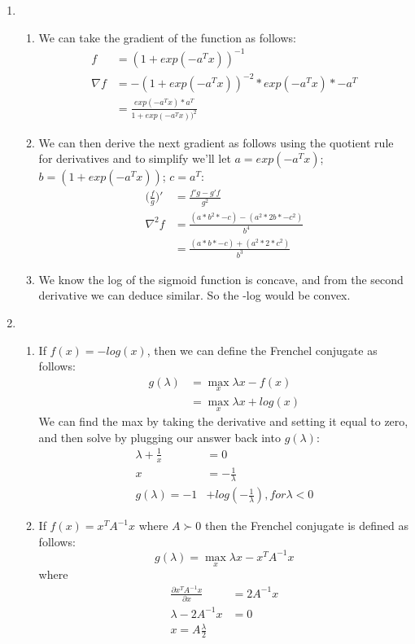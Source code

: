 \documentclass[11pt,a4paper]{article}
\begin{document}
\begin{enumerate}
			\item
			\begin{enumerate}
				\item We can take the gradient of the function as follows:
				\begin{align*}
				f &= (1+exp(-a^Tx))^{-1} \\
				\nabla f &= -(1+exp(-a^Tx))^{-2} * exp(-a^Tx) * -a^T \\
						 &= \frac{exp(-a^Tx) * a^T}{1+exp(-a^Tx))^{2}}
				\end{align*}
				\item We can then derive the next gradient as follows using the quotient rule for derivatives and to simplify we'll let $a = exp(-a^Tx)$; $b=(1+exp(-a^Tx))$; $c = a^T$:
				\begin{align*}
				\Big(\frac{f}{g}\Big)' &= \frac{f'g - g'f}{g^2} \\
				\nabla^2 f &= \frac{(a * b^2 * -c) - (a^2 * 2b * -c^2)}{b^4} \\
				&= \frac{(a * b * -c) + (a^2 * 2 * c^2)}{b^3}
				\end{align*}
				\item We know the log of the sigmoid function is concave, and from the second derivative we can deduce similar. So the -log would be convex.
			\end{enumerate}
			\item
			\begin{enumerate}
				\item If $f(x)=-log(x)$, then we can define the Frenchel conjugate as follows:
				\begin{align*}
				g(\lambda) &= \max_x \lambda x - f(x) \\
				&= \max_x \lambda x + log(x)
				\end{align*}
				We can find the max by taking the derivative and setting it equal to zero, and then solve by plugging our answer back into $g(\lambda)$:
				\begin{align*}
					\lambda+\frac{1}{x} &= 0 \\
					x &= -\frac{1}{\lambda} \\
					g(\lambda) = -1 &+ log(-\frac{1}{\lambda}), for \lambda<0
				\end{align*}
				
				\item If $f(x) = x^T A^{-1}x$ where $A \succ 0$ then the Frenchel conjugate is defined as follows:
				$$g(\lambda) = \max_x \lambda x - x^T A^{-1}x$$ where
				\begin{align*}
				\frac{\partial x^T A^{-1}x}{\partial x} &= 2A^{-1}x \\
				\lambda - 2A^{-1}x &= 0 \\
				x = A\frac{\lambda}{2}
				\end{align*}
			\end{enumerate}
		

\end{enumerate}
\end{document}
